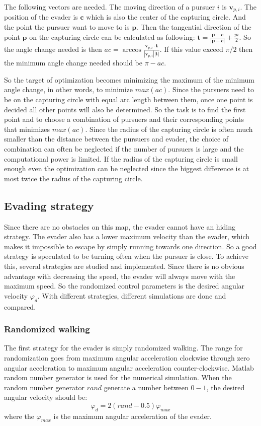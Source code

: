 \documentclass[ebook,11pt] {kth-mag}
\begin{document}
The following vectors are needed. The moving direction of a pursuer $i$ is $\bm{v}_{p,i}$. 
The position of the evader is $\bm{c}$ which is also the center of the capturing circle.
And the point the pursuer want to move to is $\bm{p}$. Then the tangential direction of the point $\bm{p}$ on the capturing circle can be calculated as following: $\bm{t} = \frac{\bm{p}-\bm{c}}{|\bm{p}-\bm{c}|}+\frac{pi}{2}$. So the angle change needed is then $ac = \arccos{\frac{\bm{v}_{p,i}\cdot\bm{t}}{|\bm{v}_{p,i}| |\bm{t}|}}$. If this value exceed $\pi/2$ then the minimum angle change needed should be $\pi-ac$. 

So the target of optimization becomes minimizing the maximum of the minimum angle change, in other words, to minimize $max(ac)$. Since the pursuers need to be on the capturing circle with equal arc length between them, once one point is decided all other points will also be determined. So the task is to find the first point and to choose a combination of pursuers and their corresponding points that minimizes $max(ac)$. Since the radius of the capturing circle is often much smaller than the distance between the pursuers and evader, the choice of combination can often be neglected if the number of pursuers is large and the computational power is limited. If the radius of the capturing circle is small enough even the optimization can be neglected since the biggest difference is at most twice the radius of the capturing circle. 

\subsection{Evading strategy}
Since there are no obstacles on this map, the evader cannot have an hiding strategy. The evader also has a lower maximum velocity than the evader, which makes it impossible to escape by simply running towards one direction. So a good strategy is speculated to be turning often when the pursuer is close. To achieve this, several strategies are studied and implemented. Since there is no obvious advantage with decreasing the speed, the evader will always move with the maximum speed. So the randomized control parameters is the desired angular velocity $\varphi_d$. With different strategies, different simulations are done and compared. 

\subsubsection{Randomized walking}
The first strategy for the evader is simply randomized walking. The range for randomization goes from maximum angular acceleration clockwise through zero angular acceleration to maximum angular acceleration counter-clockwise. Matlab random number generator is used for the numerical simulation.  When the random number generator $rand$ generate a number between $0-1$, the desired angular velocity should be: 
$$
\varphi_d = 2(rand-0.5)\varphi_{max}
$$
where the $\varphi_{max}$ is the maximum angular acceleration of the evader. 
\end{document}
